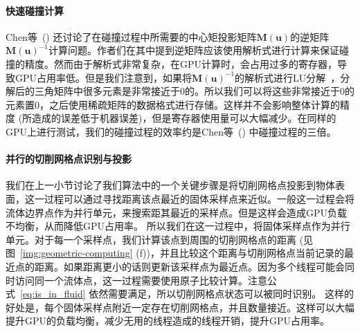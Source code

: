 \paragraph{快速碰撞计算}
Chen等~(\citeyear{Chen-2021}) 还讨论了在碰撞过程中所需要的中心矩投影矩阵$\bm{M}(\bm{u})$的逆矩阵$\bm{M}(\bm{u})^{-1}$计算问题。作者们在其中提到逆矩阵应该使用解析式进行计算来保证碰撞的精度。然而由于解析式非常复杂，在GPU计算时，会占用过多的寄存器，导致GPU占用率低。但是我们注意到，如果将$\bm{M}(\bm{u})^{-1}$的解析式进行LU分解~\cite{fei2018three}，分解后的三角矩阵中很多元素是非常接近于0的。所以我们可以将这些非常接近于0的元素置0，之后使用稀疏矩阵的数据格式进行存储。这样并不会影响整体计算的精度 (所造成的误差低于机器误差)，但是寄存器使用量可以大幅减少。在同样的GPU上进行测试，我们的碰撞过程的效率约是Chen等~(\citeyear{Chen-2021}) 中碰撞过程的三倍。

\paragraph{并行的切削网格点识别与投影}
我们在上一小节讨论了我们算法中的一个关键步骤是将切削网格点投影到物体表面，这一过程可以通过寻找距离该点最近的固体采样点来近似。一般这一过程会将流体边界点作为并行单元，来搜索距其最近的采样点。但是这样会造成GPU负载不均衡，从而降低GPU占用率。
所以我们在这一过程中，将固体采样点作为并行单元。对于每一个采样点，我们计算该点到周围的切削网格点的距离 (见图~\ref{img:geometric-computing} (f))，并且比较这个距离与切削网格点当前记录的最近点的距离。如果距离更小的话则更新该采样点为最近点。因为多个线程可能会同时访问同一个流体点，这一过程需要使用原子比较计算。注意公式~\ref{eq:is_in_fluid} 依然需要满足，所以切削网格点状态可以被同时识别。
这样的好处是，每个固体采样点附近一定存在切削网格点，并且数量接近。这样可以大幅提升GPU的负载均衡，减少无用的线程造成的线程开销，提升GPU占用率。

